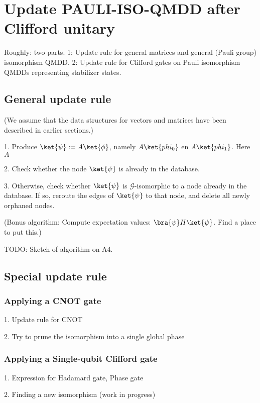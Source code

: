 \section{Update PAULI-ISO-QMDD after Clifford unitary}

Roughly: two parts. 1: Update rule for general matrices and general (Pauli group) isomorphism QMDD. 2: Update rule for Clifford gates on Pauli isomorphism QMDDs representing stabilizer states.


\subsection{General update rule}

(We assume that the data structures for vectors and matrices have been described in earlier sections.)

1. Produce $\ket{\psi}:=A\ket{\phi}$, namely  $A\ket{phi_0}$ en $A\ket{phi_1}$. Here $A$ 

2. Check whether the node $\ket{\psi}$ is already in the database.

3. Otherwise, check whether $\ket{\psi}$ is $\mathcal{G}$-isomorphic to a node already in the database. If so, reroute the edges of $\ket{\psi}$ to that node, and delete all newly orphaned nodes.

(Bonus algorithm: Compute expectation values: $\bra{\psi} H \ket{\psi}$. Find a place to put this.)

TODO: Sketch of algorithm on A4.

\subsection{Special update rule}

\subsubsection{Applying a CNOT gate}

1. Update rule for CNOT

2. Try to prune the isomorphism into a single global phase

\subsubsection{Applying a Single-qubit Clifford gate}

1. Expression for Hadamard gate, Phase gate

2. Finding a new isomorphism (work in progress)



